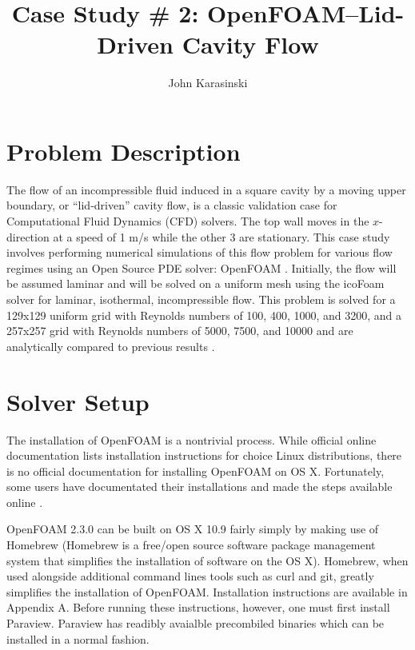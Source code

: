 \documentclass[twocolumn,10pt]{asme2ej}
\title{Case Study \# 2: OpenFOAM–Lid-Driven Cavity Flow}
\author{John Karasinski
    \affiliation{
  Graduate Student Researcher\\
  Center for Human/Robotics/Vehicle Integration and Performance\\
  Department of Mechanical and Aerospace Engineering\\
  University of California\\
  Davis, California 95616\\
    Email: karasinski@ucdavis.edu
    }
}
\begin{document}
\maketitle

\section{Problem Description}
The flow of an incompressible fluid induced in a square cavity by a moving upper boundary, or ``lid-driven'' cavity flow, is a classic validation case for Computational Fluid Dynamics (CFD) solvers. The top wall moves in the $x$-direction at a speed of 1 m/s while the other 3 are stationary. This case study involves performing numerical simulations of this flow problem for various flow regimes using an Open Source PDE solver: OpenFOAM \cite{jasak2007openfoam}. Initially, the flow will be assumed laminar and will be solved on a uniform mesh using the icoFoam solver for laminar, isothermal, incompressible flow. This problem is solved for a 129x129 uniform grid with Reynolds numbers of 100, 400, 1000, and 3200, and a 257x257 grid with Reynolds numbers of 5000, 7500, and 10000 and are analytically compared to previous results \cite{ghia1982high}.

\section{Solver Setup}
The installation of OpenFOAM is a nontrivial process. While official online documentation lists installation instructions for choice Linux distributions, there is no official documentation for installing OpenFOAM on OS X. Fortunately, some users have documentated their installations and made the steps available online \cite{ctfm_1}.

OpenFOAM 2.3.0 can be built on OS X 10.9 fairly simply by making use of Homebrew (Homebrew is a free/open source software package management system that simplifies the installation of software on the OS X). Homebrew, when used alongside additional command lines tools such as curl and git, greatly simplifies the installation of OpenFOAM. Installation instructions are available in Appendix A. Before running these instructions, however, one must first install Paraview. Paraview has readibly avaialble precombiled binaries which can be installed in a normal fashion.
\end{document}
